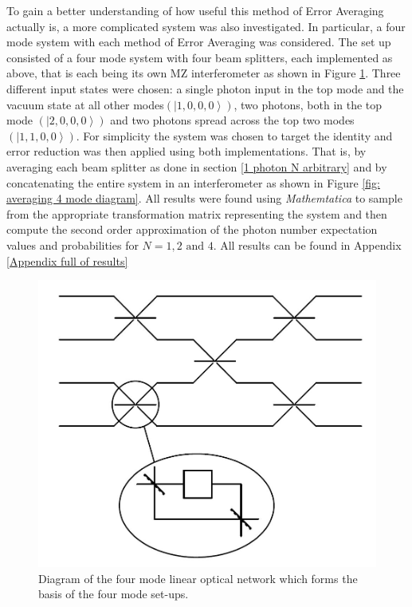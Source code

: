 \documentclass[aps,pra,twocolumn,superscriptaddress,numerical]{revtex4-1}
\begin{document}
		To gain a better understanding of how useful this method of Error Averaging actually is, a more complicated system was also investigated. In particular, a four mode system with each method of Error Averaging was considered. The set up consisted of a four mode system with four beam splitters, each implemented as above, that is each being its own MZ interferometer as shown in Figure \ref{fig:4 mode basis diagram}. Three different input states were chosen: a single photon input in the top mode and the vacuum state at all other modes$\left(\left|1,0,0,0\right\rangle \right)$, two photons, both in the top mode $\left(\left|2,0,0,0\right\rangle \right)$ and two photons spread across the top two modes $\left(\left|1,1,0,0\right\rangle \right)$. For simplicity the system was chosen to target the identity and error reduction was then applied using both implementations. That is, by averaging each beam splitter as done in section \ref{1 photon N arbitrary} and by concatenating the entire system in an interferometer as shown in Figure \ref{fig: averaging 4 mode diagram}. All results were found using \textit{Mathemtatica} to sample from the appropriate transformation matrix representing the system and then compute the second order approximation of the photon number expectation values and probabilities for $N=1, 2 \textrm{ and } 4$. All results can be found in Appendix \ref{Appendix full of results}
		
		\begin{figure}[h]
			\begin{centering}
				\includegraphics[width=\columnwidth]{4_mode_N=2.jpg}
				\par\end{centering}
			
			\caption{Diagram of the four mode linear optical network which forms the basis of the four mode set-ups. \label{fig:4 mode basis diagram}}
		\end{figure}
		
\end{document}
